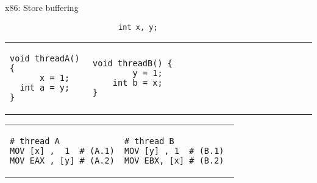 \begin{frame}[fragile,t]{x86: Store buffering}


\begin{verbatim}
                          int x, y;
\end{verbatim}

\begin{tabular}{p{} p{}}

\begin{verbatim}
void threadA() {
      x = 1;
  int a = y;
}
\end{verbatim}

& 

\begin{verbatim}
void threadB() {                                   
        y = 1;                           
    int b = x;                           
}                    
\end{verbatim}
\end{tabular}


\pause



\begin{tabular}{p{} p{}}
\begin{verbatim}
# thread A
MOV [x] ,  1  # (A.1)
MOV EAX , [y] # (A.2)
\end{verbatim}

& 

\begin{verbatim}
# thread B          
MOV [y] , 1  # (B.1) 
MOV EBX, [x] # (B.2) 
\end{verbatim}
\end{tabular}

\end{frame}


